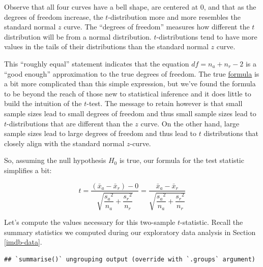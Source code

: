 \documentclass[
]{book}
\newenvironment{Shaded}{\begin{snugshade}}{\end{snugshade}}
\newcommand{\DataTypeTok}[1]{\textcolor[rgb]{0.13,0.29,0.53}{#1}}
\newcommand{\KeywordTok}[1]{\textcolor[rgb]{0.13,0.29,0.53}{\textbf{#1}}}
\newcommand{\NormalTok}[1]{#1}
\newcommand{\OperatorTok}[1]{\textcolor[rgb]{0.81,0.36,0.00}{\textbf{#1}}}
\newcommand{\StringTok}[1]{\textcolor[rgb]{0.31,0.60,0.02}{#1}}
\begin{document}
Observe that all four curves have a bell shape, are centered at 0, and that as the degrees of freedom increase, the \(t\)-distribution more and more resembles the standard normal \(z\) curve. The ``degrees of freedom''  measures how different the \(t\) distribution will be from a normal distribution. \(t\)-distributions tend to have more values in the tails of their distributions than the standard normal \(z\) curve.

This ``roughly equal'' statement indicates that the equation \(df = n_a + n_r - 2\) is a ``good enough'' approximation to the true degrees of freedom. The true \href{https://en.wikipedia.org/wiki/Student\%27s_t-test\#Equal_or_unequal_sample_sizes,_unequal_variances}{formula} is a bit more complicated than this simple expression, but we've found the formula to be beyond the reach of those new to statistical inference and it does little to build the intuition of the \(t\)-test. The message to retain however is that small sample sizes lead to small degrees of freedom and thus small sample sizes lead to \(t\)-distributions that are different than the \(z\) curve. On the other hand, large sample sizes lead to large degrees of freedom and thus lead to \(t\) distributions that closely align with the standard normal \(z\)-curve.

So, assuming the null hypothesis \(H_0\) is true, our formula for the test statistic simplifies a bit:

\[t = \dfrac{ (\bar{x}_a - \bar{x}_r) - 0}{ \sqrt{\dfrac{{s_a}^2}{n_a} + \dfrac{{s_r}^2}{n_r}}  } = \dfrac{ \bar{x}_a - \bar{x}_r}{ \sqrt{\dfrac{{s_a}^2}{n_a} + \dfrac{{s_r}^2}{n_r}}  }\]

Let's compute the values necessary for this two-sample \(t\)-statistic. Recall the summary statistics we computed during our exploratory data analysis in Section \ref{imdb-data}.

\begin{Shaded}
\end{Shaded}

\begin{verbatim}
## `summarise()` ungrouping output (override with `.groups` argument)
\end{verbatim}
\end{document}
